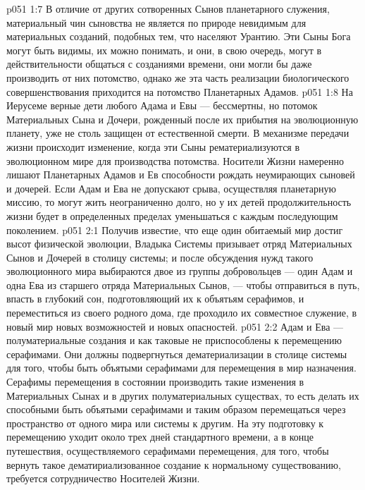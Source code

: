 \vs p051 1:7 В отличие от других сотворенных Сынов планетарного служения, материальный чин сыновства не является по природе невидимым для материальных созданий, подобных тем, что населяют Урантию. Эти Сыны Бога могут быть видимы, их можно понимать, и они, в свою очередь, могут в действительности общаться с созданиями времени, они могли бы даже производить от них потомство, однако же эта часть реализации биологического совершенствования приходится на потомство Планетарных Адамов.
\vs p051 1:8 \pc На Иерусеме верные дети любого Адама и Евы --- бессмертны, но потомок Материальных Сына и Дочери, рожденный после их прибытия на эволюционную планету, уже не столь защищен от естественной смерти. В механизме передачи жизни происходит изменение, когда эти Сыны рематериализуются в эволюционном мире для производства потомства. Носители Жизни намеренно лишают Планетарных Адамов и Ев способности рождать неумирающих сыновей и дочерей. Если Адам и Ева не допускают срыва, осуществляя планетарную миссию, то могут жить неограниченно долго, но у их детей продолжительность жизни будет в определенных пределах уменьшаться с каждым последующим поколением.
\vs p051 2:1 Получив известие, что еще один обитаемый мир достиг высот физической эволюции, Владыка Системы призывает отряд Материальных Сынов и Дочерей в столицу системы; и после обсуждения нужд такого эволюционного мира выбираются двое из группы добровольцев --- один Адам и одна Ева из старшего отряда Материальных Сынов, --- чтобы отправиться в путь, впасть в глубокий сон, подготовляющий их к объятьям серафимов, и переместиться из своего родного дома, где проходило их совместное служение, в новый мир новых возможностей и новых опасностей.
\vs p051 2:2 Адам и Ева --- полуматериальные создания и как таковые не приспособлены к перемещению серафимами. Они должны подвергнуться дематериализации в столице системы для того, чтобы быть объятыми серафимами для перемещения в мир назначения. Серафимы перемещения в состоянии производить такие изменения в Материальных Сынах и в других полуматериальных существах, то есть делать их способными быть объятыми серафимами и таким образом перемещаться через пространство от одного мира или системы к другим. На эту подготовку к перемещению уходит около трех дней стандартного времени, а в конце путешествия, осуществляемого серафимами перемещения, для того, чтобы вернуть такое дематириализованное создание к нормальному существованию, требуется сотрудничество Носителей Жизни.
